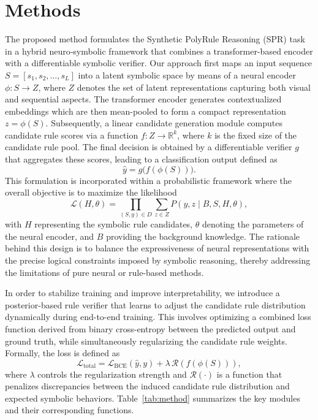 \documentclass{article}
\begin{document}
\section{Methods}
The proposed method formulates the Synthetic PolyRule Reasoning (SPR) task in a hybrid neuro‐symbolic framework that combines a transformer-based encoder with a differentiable symbolic verifier. Our approach first maps an input sequence \(S = [s_1, s_2, \ldots, s_L]\) into a latent symbolic space by means of a neural encoder \(\phi: S \rightarrow Z\), where \(Z\) denotes the set of latent representations capturing both visual and sequential aspects. The transformer encoder generates contextualized embeddings which are then mean-pooled to form a compact representation \(z = \phi(S)\). Subsequently, a linear candidate generation module computes candidate rule scores via a function \(f: Z \rightarrow \mathbb{R}^k\), where \(k\) is the fixed size of the candidate rule pool. The final decision is obtained by a differentiable verifier \(g\) that aggregates these scores, leading to a classification output defined as 
\[
\hat{y} = g\big(f(\phi(S))\big).
\]
This formulation is incorporated within a probabilistic framework where the overall objective is to maximize the likelihood
\[
\mathcal{L}(H,\theta)=\prod_{(S,y)\in D}\sum_{z\in Z} P(y,z \mid B,S,H,\theta),
\]
with \(H\) representing the symbolic rule candidates, \(\theta\) denoting the parameters of the neural encoder, and \(B\) providing the background knowledge. The rationale behind this design is to balance the expressiveness of neural representations with the precise logical constraints imposed by symbolic reasoning, thereby addressing the limitations of pure neural or rule-based methods.

In order to stabilize training and improve interpretability, we introduce a posterior-based rule verifier that learns to adjust the candidate rule distribution dynamically during end-to-end training. This involves optimizing a combined loss function derived from binary cross-entropy between the predicted output and ground truth, while simultaneously regularizing the candidate rule weights. Formally, the loss is defined as 
\[
\mathcal{L}_{\text{total}} = \mathcal{L}_{\text{BCE}}(\hat{y}, y) + \lambda \, \mathcal{R}(f(\phi(S))),
\]
where \(\lambda\) controls the regularization strength and \(\mathcal{R}(\cdot)\) is a function that penalizes discrepancies between the induced candidate rule distribution and expected symbolic behaviors. Table~\ref{tab:method} summarizes the key modules and their corresponding functions.
\end{document}
